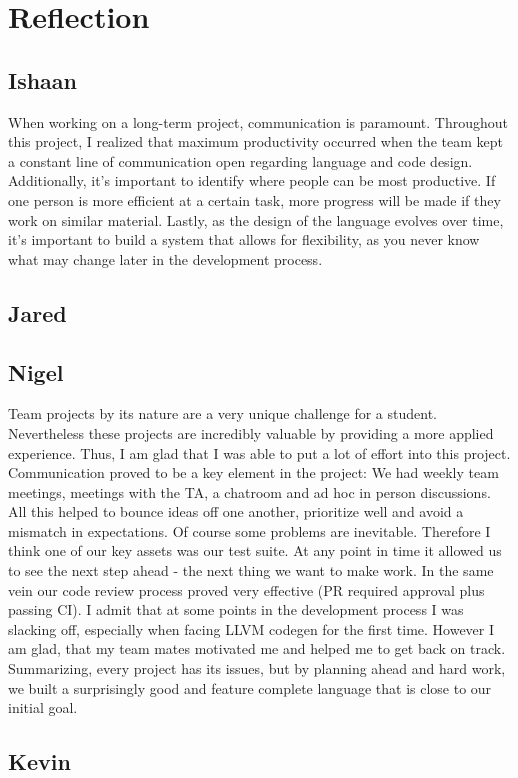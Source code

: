 \chapter{Reflection}

\section{Ishaan}
When working on a long-term project, communication is paramount. Throughout this project, I realized that maximum productivity occurred when the team kept a constant line of communication open regarding language and code design.
Additionally, it's important to identify where people can be most productive. If one person is more efficient at a certain task, more progress will be made if they work on similar material.
Lastly, as the design of the language evolves over time, it's important to build a system that allows for flexibility, as you never know what may change later in the development process.

\section{Jared}

\section{Nigel}
Team projects by its nature are a very unique challenge for a student. Nevertheless these projects are incredibly valuable by providing a more applied experience. Thus, I am glad that I was able to put a lot of effort into this project. Communication proved to be a key element in the project: We had weekly team meetings, meetings with the TA, a chatroom and ad hoc in person discussions. All this helped to bounce ideas off one another, prioritize well and avoid a mismatch in expectations.
Of course some problems are inevitable. Therefore I think one of our key assets was our test suite. At any point in time it allowed us to see the next step ahead - the next thing we want to make work. In the same vein our code review process proved very effective (PR required approval plus passing CI).
I admit that at some points in the development process I was slacking off, especially when facing LLVM codegen for the first time. However I am glad, that my team mates motivated me and helped me to get back on track.
Summarizing, every project has its issues, but by planning ahead and hard work, we built a surprisingly good and feature complete language that is close to our initial goal.

\section{Kevin}
